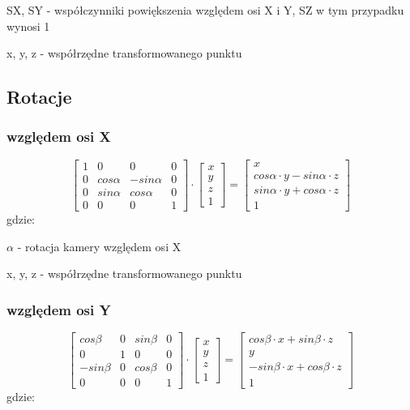 \documentclass[11pt]{article}
\begin{document}
SX, SY - współczynniki powiększenia względem osi X i Y, SZ w tym przypadku wynosi 1

x, y, z - współrzędne transformowanego punktu

\subsection{Rotacje}
\subsubsection{względem osi X}
\begin{equation}
    \begin{bmatrix}
        1 & 0 & 0 & 0\\
        0 & cos \alpha & -sin \alpha & 0\\
        0 & sin \alpha & cos \alpha & 0\\
        0 & 0 & 0 & 1
    \end{bmatrix}
    \cdot
    \begin{bmatrix}
        x\\
        y\\
        z\\
        1
    \end{bmatrix}
    =
    \begin{bmatrix}
        x\\
        cos \alpha \cdot y - sin \alpha \cdot z\\
        sin \alpha \cdot y + cos \alpha \cdot z\\
        1
    \end{bmatrix}
\end{equation}
gdzie:

$\alpha$ - rotacja kamery względem osi X

x, y, z - współrzędne transformowanego punktu

\subsubsection{względem osi Y}
\begin{equation}
    \begin{bmatrix}
        cos \beta & 0 & sin \beta & 0\\
        0 & 1 & 0 & 0\\
        -sin \beta & 0 & cos \beta & 0\\
        0 & 0 & 0 & 1
    \end{bmatrix}
    \cdot
    \begin{bmatrix}
        x\\
        y\\
        z\\
        1
    \end{bmatrix}
    =
    \begin{bmatrix}
        cos \beta \cdot x + sin \beta \cdot z\\
        y\\
        -sin \beta \cdot x + cos \beta \cdot z\\
        1
    \end{bmatrix}
\end{equation}
gdzie:
\end{document}
